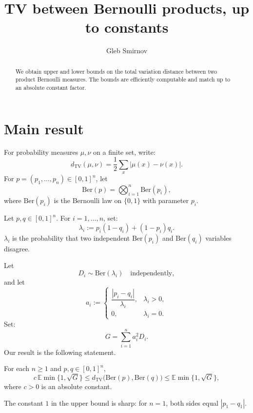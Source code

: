 \documentclass[12pt,reqno]{amsart}
\numberwithin{equation}{section}
\begin{document}
\title[TV between Bernoulli products, up to constants]{TV between Bernoulli products, up to constants}

\author{Gleb Smirnov}
\address{
Mathematical Sciences Institute, 
Australian National University, Canberra, Australia}



\begin{abstract}
We obtain upper and lower bounds on the total variation distance between two product Bernoulli measures. The bounds are efficiently
computable and match up to an absolute constant factor.
\end{abstract}

\maketitle
\setcounter{section}{0}

\section{Main result}\label{main_results}

For probability measures \(\mu,\nu\) on a finite set, write:
\[
d_{\mathrm{TV}}(\mu,\nu)
=
\frac12\sum_x|\mu(x)-\nu(x)|.
\]
For \(p=(p_1,\ldots,p_n)\in[0,1]^n\), let
\[
\mathrm{Ber}(p)
=
\bigotimes_{i=1}^n\mathrm{Ber}(p_i),
\]
where \(\mathrm{Ber}(p_i)\) is the Bernoulli law on \(\{0,1\}\)
with parameter \(p_i\).
\smallskip%

Let $p,q\in[0,1]^n$. For $i=1,\ldots,n$, set:
\[
\lambda_i
:=
p_i(1-q_i)+(1-p_i)q_i.
\]
$\lambda_i$ is the probability 
that two independent
$\mathrm{Ber}(p_i)$ and $\mathrm{Ber}(q_i)$ variables disagree.
\smallskip%

Let
\[
D_i\sim\mathrm{Ber}(\lambda_i)
\quad\text{independently},
\]
and let
\[
a_i
:=
\begin{cases}
\dfrac{|p_i-q_i|}{\lambda_i},&\lambda_i>0,\\
0,&\lambda_i=0.
\end{cases}
\]
Set:
\[
G = \sum_{i=1}^n a_i^2 D_i.
\]
Our result is the following statement.

\begin{theorem}\label{main}
For each $n\ge1$ and $p,q\in[0,1]^n$,
\[
c\,\mathbb E\min\{1,\sqrt G\}
\le
d_{\mathrm{TV}}\bigl(\mathrm{Ber}(p),\mathrm{Ber}(q)\bigr)
\le
\mathbb E\min\{1,\sqrt G\},
\]
where \(c > 0\) is an absolute constant.
\end{theorem}
The constant \(1\) in the upper bound is sharp: for \(n=1\), both sides
equal \(|p_1-q_1|\).
\smallskip%
\end{document}
